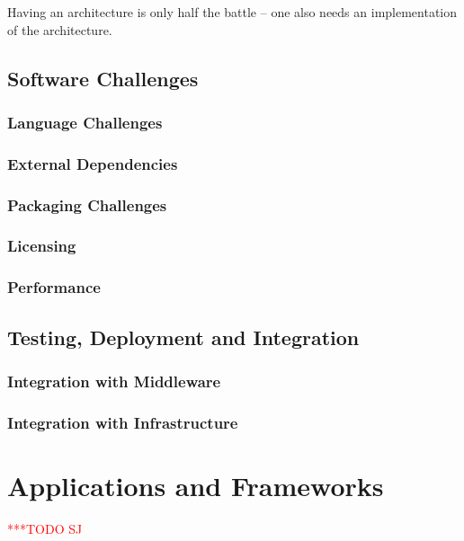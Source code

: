 \documentclass[a4paper,12pt]{article}
\newcommand{\todo}[1]{     {\textcolor{red}  { ***TODO      #1 }}}
\newcommand{\todo}[1]{}
\begin{document}
Having an architecture is only half the battle -- one also needs an
implementation of the architecture.


\subsection{Software Challenges}


\subsubsection{Language Challenges}

\subsubsection{External Dependencies}

\subsubsection{Packaging Challenges}

\subsubsection{Licensing}

\subsubsection{Performance}



\subsection{Testing, Deployment and Integration} 



\subsubsection{Integration with Middleware}
\subsubsection{Integration with Infrastructure}



% 
\section{Applications and Frameworks}\todo{SJ}
\label{apps_and_frameworks}
\end{document}
